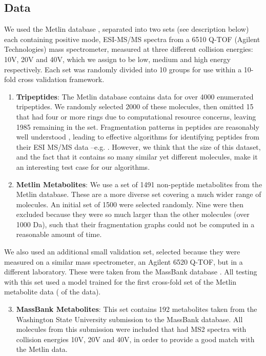 \subsection{Data}
We used the Metlin database \citep{Smith2005},
separated into two sets (see description below) each containing positive mode, ESI-MS/MS spectra from a 6510 Q-TOF (Agilent Technologies) mass spectrometer, measured at three different collision energies: 10V, 20V and 40V, which we assign to be low, medium and high energy respectively.
Each set was randomly divided into 10 groups for use within a 10-fold cross validation framework.
\begin{enumerate}

\item \textbf{Tripeptides}: The Metlin database contains data for over 4000 enumerated tripeptides. We randomly selected 2000 of these molecules, then omitted 15 that had four or more rings due to computational resource concerns, leaving 1985 remaining in the set.
Fragmentation patterns in peptides are reasonably well understood \citep{Papayannopoulos1995, Paizs2005}, leading to effective algorithms for identifying peptides from their ESI MS/MS data --e.g. \citep{Pappin1999,Eng1994,Ma2003}.  
However, we think that the size of this dataset, and the fact that it contains so many similar yet different molecules, make it an interesting test case for our algorithms. 

\item \textbf{Metlin Metabolites}: We use a set of 1491 non-peptide metabolites from the Metlin database.  These are a more diverse set covering a much wider range of molecules. An initial set of 1500 were selected randomly. Nine were then excluded because they were so much larger than the other molecules (over 1000 Da), such that their fragmentation graphs could not be computed in a reasonable amount of time.
\end{enumerate}

We also used an additional small validation set, selected because they were measured on a similar mass spectrometer, an Agilent 6520 Q-TOF, but in a different laboratory. These were taken from the MassBank database \citep{Horai2010}. All testing with this set used a model trained for the first cross-fold set of the Metlin metabolite data ( of the data).
\begin{enumerate}
\setcounter{enumi}{2}
\item \textbf{MassBank Metabolites}: This set contains 192 metabolites taken from the Washington State University submission to the MassBank database. All molecules from this submission were included that had MS2 spectra with collision energies 10V, 20V and 40V, in order to provide a good match with the Metlin data.
\end{enumerate}


